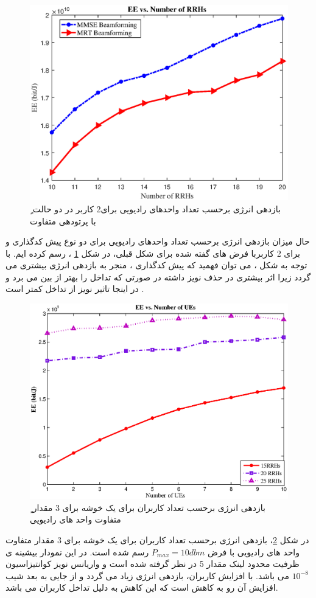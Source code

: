 \begin{figure}[H]
  \centering
    \includegraphics[width=\linewidth]{./fig/beamforming}
  \caption{ٍ بازدهی انرژی برحسب تعداد واحدهای رادیویی برای2 کاربر  در دو حالت با پرتودهی متفاوت }
  \label{fig:beam}
  \end{figure}
      حال میزان بازدهی انرژی برحسب تعداد واحدهای رادیویی برای دو نوع پیش کدگذاری  و   برای 2 کاربربا فرض های گفته شده برای شکل قبلی،  در شکل \ref{fig:beam} ، رسم کرده ایم.
  با توجه به شکل ، می توان فهمید که پیش کدگذاری ، منجر به بازدهی انرژی بیشتری می گردد زیرا  اثر بیشتری در حذف نویز داشته در صورتی که  تداخل را بهتر از بین می برد و در اینجا تاثیر نویز از تداخل کمتر است .


 \begin{figure}[H]
  \centering
    \includegraphics[width=\linewidth]{./fig/ue1}
  \caption{ٍ بازدهی انرژی برحسب تعداد کاربران برای یک خوشه برای
   3
   مقدار متفاوت واحد های رادیویی}
  \label{fig:ue1}
  \end{figure}
  در شکل \ref{fig:ue1}، بازدهی انرژی برحسب تعداد کاربران برای یک خوشه برای 3 مقدار متفاوت واحد های رادیویی با فرض $P_{max} = 10dbm$ رسم شده است. در این نمودار بیشینه ی ظرفیت محدود لینک  مقدار 5 در نظر گرفته شده است و واریانس نویز کوانتیزاسیون $10^{-8}$ می باشد. با افزایش کاربران، بازدهی انرژی زیاد می گردد و  از جایی به بعد شیب افزایش آن رو به کاهش است که این کاهش به دلیل تداخل کاربران می باشد.
 
